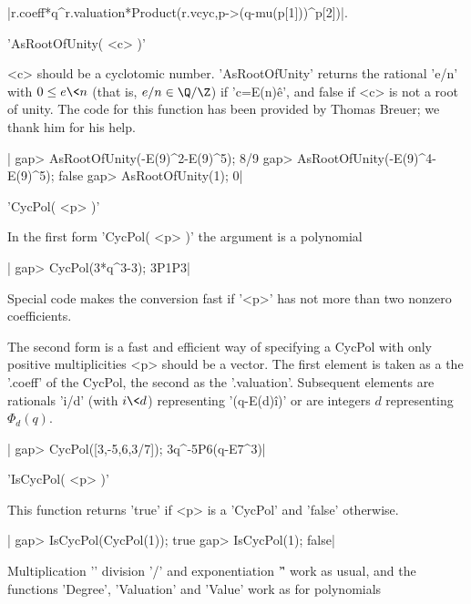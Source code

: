 |r.coeff*q^r.valuation*Product(r.vcyc,p->(q-mu(p[1]))^p[2])|.

%
%

'AsRootOfUnity( <c> )'

<c>  should be  a cyclotomic  number. 'AsRootOfUnity'  returns the rational
'e/n'  with $0\le e\<n$ (that is,  $e/n\in\Q/\Z$) if 'c=E(n)\^e', and false
if <c> is not a root of unity. The code for this function has been provided
by Thomas Breuer; we thank him for his help.

|    gap> AsRootOfUnity(-E(9)^2-E(9)^5);
    8/9
    gap> AsRootOfUnity(-E(9)^4-E(9)^5);
    false
    gap> AsRootOfUnity(1);
    0|

%
%

'CycPol( <p> )'

In the first form 'CycPol( <p> )' the argument is a polynomial\:

|    gap> CycPol(3*q^3-3);
    3P1P3|

Special code  makes the conversion fast  if '<p>' has not  more than two
nonzero coefficients.

The  second form is  a fast and  efficient way of  specifying a CycPol with
only positive multiplicities\: <p> should be a vector. The first element is
taken  as a  the '.coeff'  of the  CycPol, the  second as the '.valuation'.
Subsequent  elements  are  rationals  'i/d'  (with  $i\<  d$)  representing
'(q-E(d)\^i)' or are integers $d$ representing $\Phi_d(q)$.

|    gap> CycPol([3,-5,6,3/7]);
    3q^-5P6(q-E7^3)|

%
%

'IsCycPol( <p> )'

This function returns 'true' if <p> is a 'CycPol' and 'false' otherwise.

|    gap> IsCycPol(CycPol(1));
    true
    gap> IsCycPol(1);
    false|


Multiplication '\*' division '/' and exponentiation '\^' work as usual, and
the functions 'Degree', 'Valuation' and 'Value' work as for polynomials\:

